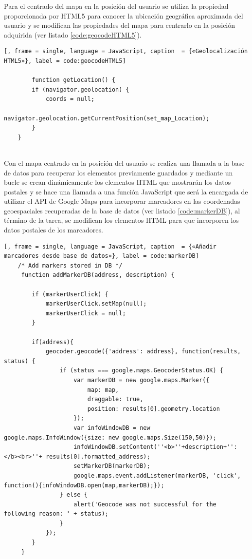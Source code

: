 	 Para el centrado del mapa en la posición del usuario se utiliza la propiedad proporcionada por HTML5 para conocer la ubicación geográfica aproximada del usuario y se modifican las propiedades del mapa para centrarlo en la posición adquirida (ver listado \ref{code:geocodeHTML5}).
	 
	 	\begin{lstlisting}[, frame = single, language = JavaScript, caption  = {«Geolocalización HTML5»}, label = code:geocodeHTML5]
		
		function getLocation() {
 		if (navigator.geolocation) {
 			coords = null;
 			navigator.geolocation.getCurrentPosition(set_map_Location);
 		}
 	}
		
	\end{lstlisting}
	 
	Con el mapa centrado en la posición del usuario se realiza una llamada a la base de datos para recuperar los elementos previamente guardados y mediante un bucle se crean dinámicamente los elementos HTML que mostrarán los datos postales  y se hace una llamada a una función JavaScript que será la encargada de utilizar el API de Google Maps para incorporar marcadores en las coordenadas geoespaciales recuperadas de la base de datos (ver listado \ref{code:markerDB}), al término de la tarea, se modifican los elementos HTML para que incorporen los datos postales de los marcadores.
	
		\begin{lstlisting}[, frame = single, language = JavaScript, caption  = {«Añadir marcadores desde base de datos»}, label = code:markerDB]
	/* Add markers stored in DB */
	 function addMarkerDB(address, description) {

	 	if (markerUserClick) {
	 		markerUserClick.setMap(null);
	 		markerUserClick = null;
	 	}

	 	if(address){
	 		geocoder.geocode({'address': address}, function(results, status) {
	 			if (status === google.maps.GeocoderStatus.OK) {
	 				var markerDB = new google.maps.Marker({
	 					map: map,
	 					draggable: true,
	 					position: results[0].geometry.location
	 				});
	 				var infoWindowDB = new google.maps.InfoWindow({size: new google.maps.Size(150,50)});
	 				infoWindowDB.setContent(''<b>''+description+'':</b><br>''+ results[0].formatted_address);
	 				setMarkerDB(markerDB);
	 				google.maps.event.addListener(markerDB, 'click', function(){infoWindowDB.open(map,markerDB);});
	 			} else {
	 				alert('Geocode was not successful for the following reason: ' + status);
	 			}
	 		});
	 	}
	 }
	 \end{lstlisting}
	
